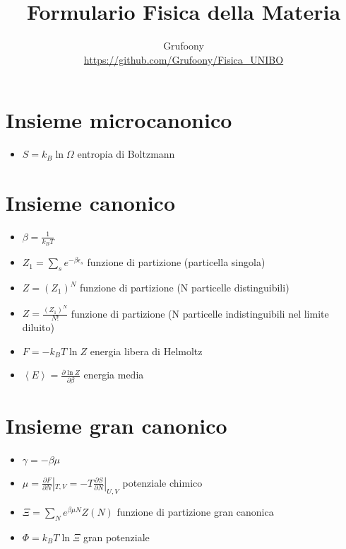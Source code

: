 \documentclass[a4paper]{article}
\begin{document}
	\title{Formulario Fisica della Materia}
	\author{Grufoony\\\url{https://github.com/Grufoony/Fisica_UNIBO}}
	\maketitle

    \section{Insieme microcanonico}
        \begin{itemize}
            \item $S=k_B\ln\Omega$ entropia di Boltzmann
        \end{itemize}

    \section{Insieme canonico}
        \begin{itemize}
            \item $\beta=\frac{1}{k_BT}$
            \item $Z_1=\sum_s e^{-\beta\epsilon_s}$ funzione di partizione (particella singola)
            \item $Z=(Z_1)^N$ funzione di partizione (N particelle distinguibili)
            \item $Z=\frac{(Z_1)^N}{N!}$ funzione di partizione (N particelle indistinguibili nel limite diluito)
            \item $F=-k_BT\ln{Z}$ energia libera di Helmoltz
            \item $\left\langle E \right\rangle = \frac{\partial\ln{Z}}{\partial\beta}$ energia media
        \end{itemize}

    \section{Insieme gran canonico}
        \begin{itemize}
            \item $\gamma=-\beta\mu$
            \item $\mu=\frac{\partial F}{\partial N}|_{T,V}=-T\frac{\partial S}{\partial N}|_{U,V}$ potenziale chimico
            \item $\Xi=\sum_Ne^{\beta\mu N}Z(N)$ funzione di partizione gran canonica
            \item $\Phi=k_BT\ln\Xi$ gran potenziale
        \end{itemize}
\end{document}
